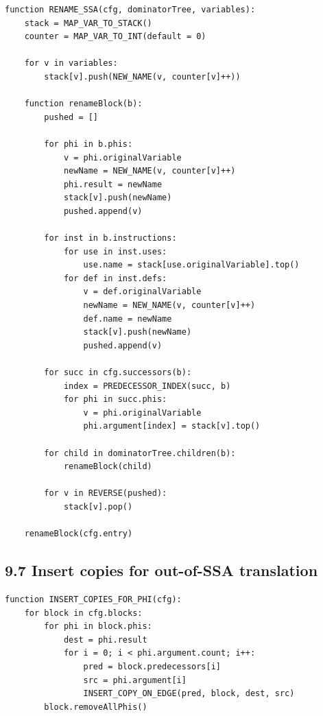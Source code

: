 \documentclass[10pt,letterpaper]{article}
\begin{document}
\begin{verbatim}
function RENAME_SSA(cfg, dominatorTree, variables):
    stack = MAP_VAR_TO_STACK()
    counter = MAP_VAR_TO_INT(default = 0)

    for v in variables:
        stack[v].push(NEW_NAME(v, counter[v]++))

    function renameBlock(b):
        pushed = []

        for phi in b.phis:
            v = phi.originalVariable
            newName = NEW_NAME(v, counter[v]++)
            phi.result = newName
            stack[v].push(newName)
            pushed.append(v)

        for inst in b.instructions:
            for use in inst.uses:
                use.name = stack[use.originalVariable].top()
            for def in inst.defs:
                v = def.originalVariable
                newName = NEW_NAME(v, counter[v]++)
                def.name = newName
                stack[v].push(newName)
                pushed.append(v)

        for succ in cfg.successors(b):
            index = PREDECESSOR_INDEX(succ, b)
            for phi in succ.phis:
                v = phi.originalVariable
                phi.argument[index] = stack[v].top()

        for child in dominatorTree.children(b):
            renameBlock(child)

        for v in REVERSE(pushed):
            stack[v].pop()

    renameBlock(cfg.entry)
\end{verbatim}

\subsection*{9.7 Insert copies for out-of-SSA translation}
{}

\begin{verbatim}
function INSERT_COPIES_FOR_PHI(cfg):
    for block in cfg.blocks:
        for phi in block.phis:
            dest = phi.result
            for i = 0; i < phi.argument.count; i++:
                pred = block.predecessors[i]
                src = phi.argument[i]
                INSERT_COPY_ON_EDGE(pred, block, dest, src)
        block.removeAllPhis()
\end{verbatim}

\end{document}
